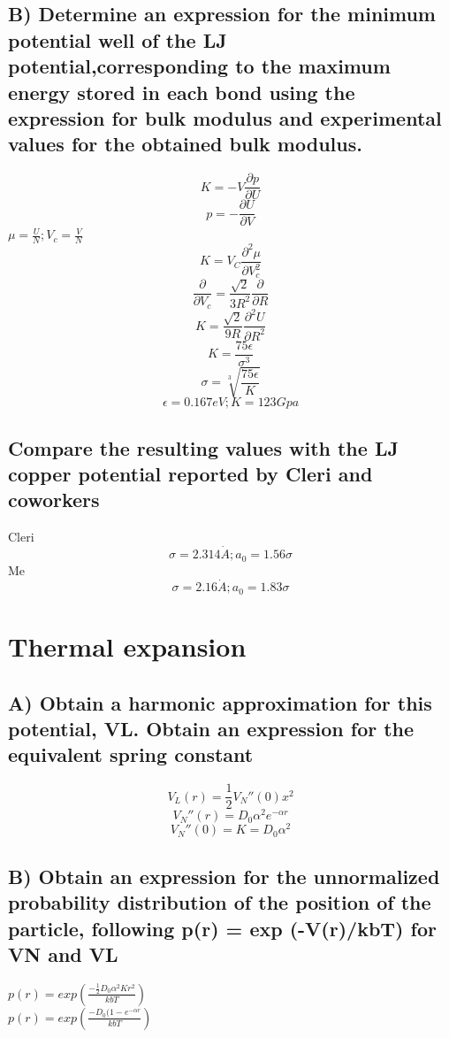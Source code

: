 \documentclass[paper=a4, fontsize=12pt]{scrartcl} %
\numberwithin{equation}{section} %
\numberwithin{figure}{section} %
\numberwithin{table}{section} %
\begin{document}
\subsection*{\small{B) Determine an expression for the minimum potential well of the LJ potential,corresponding to the maximum energy stored in each bond using the expression
for bulk modulus and experimental values for the obtained bulk modulus.}}
\[K = -V\frac{\partial p}{\partial U}\]
\[p = -\frac{\partial U}{\partial V}\] 
\( \mu = \frac{U}{N} ; V_c = \frac{V}{N}\)
\[K = V_C\frac{\partial^2\mu}{\partial V_c^2}\]
\[\frac{\partial}{\partial V_c} = \frac{\sqrt{2}}{3R^2}\frac{\partial}{\partial R}\]
\[ K = \frac{\sqrt{2}}{9R}\frac{\partial^2U}{\partial R^2}\]
\[ K = \frac{75\epsilon}{\sigma^3}\]
\[\sigma = \sqrt[3]{\frac{75\epsilon}{K}}\]
\[\epsilon = 0.167eV; K = 123Gpa\]
\begin{center}
\end{center}
\subsection*{\small{Compare the resulting values with the LJ copper potential reported by Cleri and coworkers}}
Cleri 
\[\sigma = 2.314 \dot A; a_0 = 1.56\sigma\]
Me
\[\sigma = 2.16 \dot A; a_0 = 1.83\sigma\]
\section{\small{Thermal expansion }}
\subsection*{\small A) Obtain a harmonic approximation for this potential, VL. Obtain an expression for the equivalent spring constant}
\begin{center}
\end{center}
\[V_L(r) = \frac{1}{2}V_N''(0)x^2\] 
\[V_N''(r) = D_0\alpha^2e^{-\alpha r}\]
\[V_N''(0) = K = D_0\alpha^2\]
\begin{center}
\end{center}

\subsection*{\small B) Obtain an expression for the unnormalized probability distribution of the position of the particle, following p(r) = exp (-V(r)/kbT) for VN and VL}
\(p(r) = exp(\frac{-\frac{1}{2}D_0 \alpha^2 K r^2}{kbT})\) \\
\(p(r) = exp(\frac{-D_0(1-e^{- \alpha r}}{kbT})\)  
\end{document}
